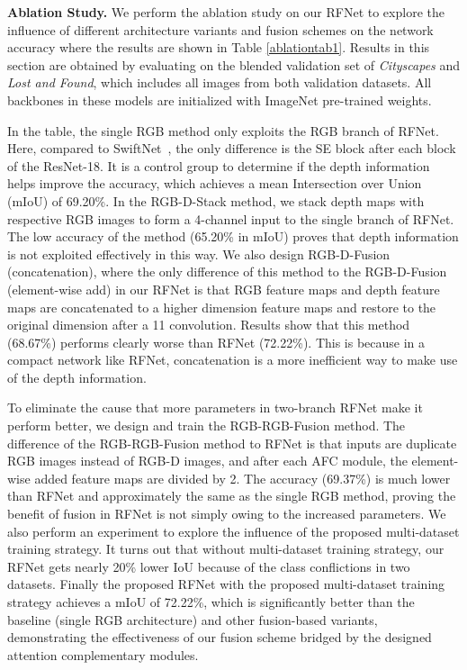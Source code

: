 \documentclass[letterpaper, 10 pt, journal, twoside]{ieeetran}
\begin{document}
\textbf{Ablation Study.}
We perform the ablation study on our RFNet to explore the influence of different architecture variants and fusion schemes on the network accuracy where the results are shown in Table \ref{ablationtab1}. Results in this section are obtained by evaluating on the blended validation set of \textit{Cityscapes} and \textit{Lost and Found}, which includes all images from both validation datasets. All backbones in these models are initialized with ImageNet pre-trained weights.


In the table, the single RGB method only exploits the RGB branch of RFNet. Here, compared to SwiftNet~\cite{orsic2019defense}, the only difference is the SE block after each block of the ResNet-18. It is a control group to determine if the depth information helps improve the accuracy, which achieves a mean Intersection over Union (mIoU) of 69.20\%. In the RGB-D-Stack method, we stack depth maps with respective RGB images to form a 4-channel input to the single branch of RFNet. The low accuracy of the method (65.20\% in mIoU) proves that depth information is not exploited effectively in this way. We also design RGB-D-Fusion (concatenation), where the only difference of this method to the RGB-D-Fusion (element-wise add) in our RFNet is that RGB feature maps and depth feature maps are concatenated to a higher dimension feature maps and restore to the original dimension after a 11 convolution. Results show that this method (68.67\%) performs clearly worse than RFNet (72.22\%). This is because in a compact network like RFNet, concatenation is a more inefficient way to make use of the depth information.

To eliminate the cause that more parameters in two-branch RFNet make it perform better, we design and train the RGB-RGB-Fusion method. The difference of the RGB-RGB-Fusion method to RFNet is that inputs are duplicate RGB images instead of RGB-D images, and after each AFC module, the element-wise added feature maps are divided by 2. The accuracy (69.37\%) is much lower than RFNet and approximately the same as the single RGB method, proving the benefit of fusion in RFNet is not simply owing to the increased parameters.
We also perform an experiment to explore the influence of the proposed multi-dataset training strategy. It turns out that without multi-dataset training strategy, our RFNet gets nearly 20\% lower IoU because of the class conflictions in two datasets. Finally the proposed RFNet with the proposed multi-dataset training strategy achieves a mIoU of 72.22\%, which is significantly better than the baseline (single RGB architecture) and other fusion-based variants, demonstrating the effectiveness of our fusion scheme bridged by the designed attention complementary modules.
\end{document}
